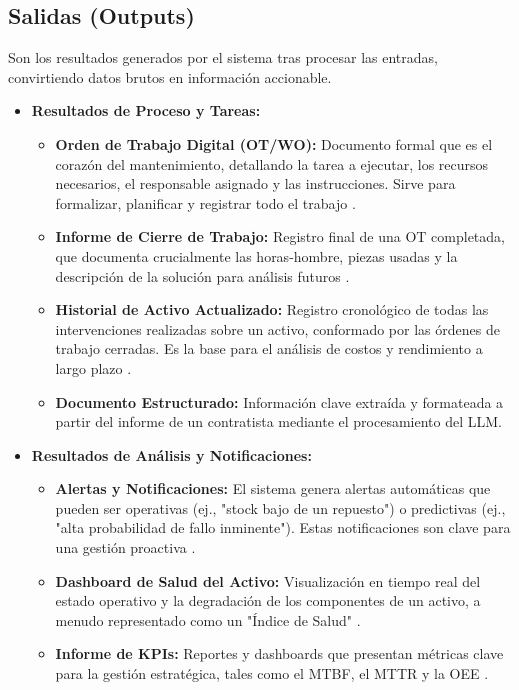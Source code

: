 \subsection{Salidas (Outputs)}

Son los resultados generados por el sistema tras procesar las entradas, convirtiendo datos brutos en información accionable.

\begin{itemize}
    \item \textbf{Resultados de Proceso y Tareas:}
    \begin{itemize}
        \item \textbf{Orden de Trabajo Digital (OT/WO):} Documento formal que es el corazón del mantenimiento, detallando la tarea a ejecutar, los recursos necesarios, el responsable asignado y las instrucciones. Sirve para formalizar, planificar y registrar todo el trabajo \parencite{accruent:2025, landau:2023, stum:2018, tractian:2025b}.
        \item \textbf{Informe de Cierre de Trabajo:} Registro final de una OT completada, que documenta crucialmente las horas-hombre, piezas usadas y la descripción de la solución para análisis futuros \parencite{ardila-marin:2018, fracttal:2024, laurila:2017}.
        \item \textbf{Historial de Activo Actualizado:} Registro cronológico de todas las intervenciones realizadas sobre un activo, conformado por las órdenes de trabajo cerradas. Es la base para el análisis de costos y rendimiento a largo plazo \parencite{ardila-marin:2018, fracttal:2024}.
        \item \textbf{Documento Estructurado:} Información clave extraída y formateada a partir del informe de un contratista mediante el procesamiento del LLM.
    \end{itemize}
    \item \textbf{Resultados de Análisis y Notificaciones:}
    \begin{itemize}
        \item \textbf{Alertas y Notificaciones:} El sistema genera alertas automáticas que pueden ser operativas (ej., "stock bajo de un repuesto") o predictivas (ej., "alta probabilidad de fallo inminente"). Estas notificaciones son clave para una gestión proactiva \parencite{chen:2025, hxgn:sf, mazenko:2015, osullivan:2020}.
        \item \textbf{Dashboard de Salud del Activo:} Visualización en tiempo real del estado operativo y la degradación de los componentes de un activo, a menudo representado como un "Índice de Salud" \parencite{chen:2025, mrzyk:2023}.
        \item \textbf{Informe de KPIs:} Reportes y dashboards que presentan métricas clave para la gestión estratégica, tales como el MTBF, el MTTR y la OEE \parencite{fiix:2019, ftmaintenance:2019, obrien:sf, osullivan:2020}.
    \end{itemize}
\end{itemize}

